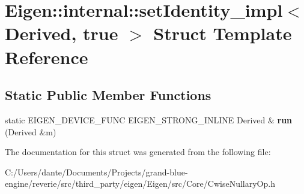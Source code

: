\hypertarget{struct_eigen_1_1internal_1_1set_identity__impl_3_01_derived_00_01true_01_4}{}\section{Eigen\+::internal\+::set\+Identity\+\_\+impl$<$ Derived, true $>$ Struct Template Reference}
\label{struct_eigen_1_1internal_1_1set_identity__impl_3_01_derived_00_01true_01_4}
\subsection*{Static Public Member Functions}
\begin{DoxyCompactItemize}
\item 
\mbox{\label{struct_eigen_1_1internal_1_1set_identity__impl_3_01_derived_00_01true_01_4_a84de7f15ad1832d9c6b51b8f32e4c571}} 
static E\+I\+G\+E\+N\+\_\+\+D\+E\+V\+I\+C\+E\+\_\+\+F\+U\+NC E\+I\+G\+E\+N\+\_\+\+S\+T\+R\+O\+N\+G\+\_\+\+I\+N\+L\+I\+NE Derived \& {\bfseries run} (Derived \&m)
\end{DoxyCompactItemize}


The documentation for this struct was generated from the following file\+:\begin{DoxyCompactItemize}
\item 
C\+:/\+Users/dante/\+Documents/\+Projects/grand-\/blue-\/engine/reverie/src/third\+\_\+party/eigen/\+Eigen/src/\+Core/Cwise\+Nullary\+Op.\+h\end{DoxyCompactItemize}
